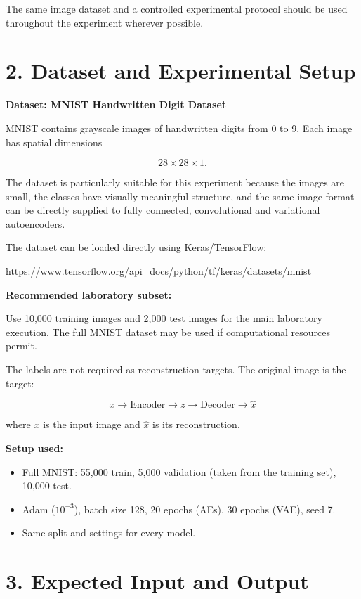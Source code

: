 \documentclass[10pt]{article}
\begin{document}
The same image dataset and a controlled experimental protocol should be used
throughout the experiment wherever possible.

\section*{2. Dataset and Experimental Setup}

\textbf{Dataset: MNIST Handwritten Digit Dataset}

MNIST contains grayscale images of handwritten digits from 0 to 9. Each image
has spatial dimensions

\[
28\times28\times1.
\]

The dataset is particularly suitable for this experiment because the images
are small, the classes have visually meaningful structure, and the same image
format can be directly supplied to fully connected, convolutional and
variational autoencoders.

The dataset can be loaded directly using Keras/TensorFlow:

\url{https://www.tensorflow.org/api_docs/python/tf/keras/datasets/mnist}

\textbf{Recommended laboratory subset:}

Use 10,000 training images and 2,000 test images for the main laboratory
execution. The full MNIST dataset may be used if computational resources
permit.

The labels are not required as reconstruction targets. The original image is
the target:

\[
\boxed{x\rightarrow \text{Encoder}\rightarrow z
\rightarrow\text{Decoder}\rightarrow\hat{x}}
\]

where $x$ is the input image and $\hat{x}$ is its reconstruction.

\textbf{Setup used:}
\begin{itemize}
\item Full MNIST: 55,000 train, 5,000 validation (taken from the training set), 10,000 test.
\item Adam ($10^{-3}$), batch size 128, 20 epochs (AEs), 30 epochs (VAE), seed 7.
\item Same split and settings for every model.
\end{itemize}

\section*{3. Expected Input and Output}
\end{document}
